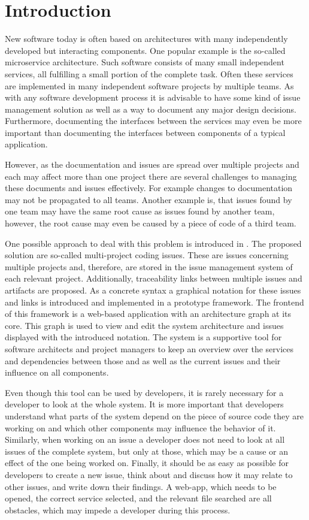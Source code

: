 
\chapter{Introduction}
\label{chap:ch1}
New software today is often based on architectures with many independently developed but interacting components.
One popular example is the so-called microservice architecture.
Such software consists of many small independent services, all fulfilling a small portion of the complete task.
Often these services are implemented in many independent software projects by multiple teams.
As with any software development process it is advisable to have some kind of issue management solution 
as well as a way to document any major design decisions.
Furthermore, documenting the interfaces between the services may even be more important 
than documenting the interfaces between components of a typical application.

However, as the documentation and issues are spread over multiple projects
and each may affect more than one project there are several challenges to managing these documents and issues effectively.
For example changes to documentation may not be propagated to all teams. 
Another example is, that issues found by one team may have the same root cause as issues found by another team, 
however, the root cause may even be caused by a piece of code of a third team.

One possible approach to deal with this problem is introduced in \cite{Speth2019}.
The proposed solution are so-called multi-project coding issues. 
These are issues concerning multiple projects and, therefore, are stored in the issue management system of each relevant project. 
Additionally, traceability links between multiple issues and artifacts are proposed.
As a concrete syntax a graphical notation for these issues and links is introduced and implemented in a prototype framework. 
The frontend of this framework is a web-based application with an architecture graph at its core.
This graph is used to view and edit the system architecture and issues displayed with the introduced notation. 
The system is a supportive tool for software architects and project managers to keep an overview over the services
and dependencies between those and as well as the current issues and their influence on all components.

Even though this tool can be used by developers, it is rarely necessary for a developer to look at the whole system. 
It is more important that developers understand what parts of the system depend on the piece of source code they are working on and which other components may influence the behavior of it. 
Similarly, when working on an issue a developer does not need to look at all issues of the complete system, but only at those, which may be a cause or an effect of the one being worked on. 
Finally, it should be as easy as possible for developers to create a new issue, think about and discuss how it may relate to other issues, and write down their findings.
A web-app,  which needs to be opened, the correct service selected, and the relevant file searched are all obstacles, which may impede a developer during this process. 

